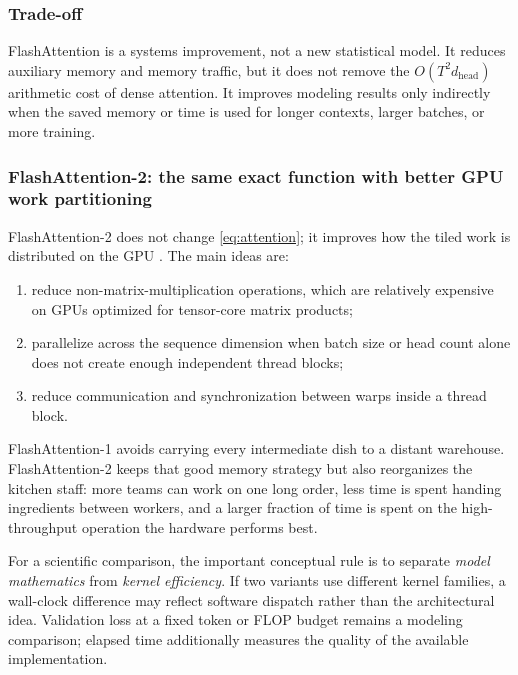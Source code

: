 \documentclass[11pt,a4paper]{article}
\theoremstyle{definition}
\theoremstyle{plain}
\newcommand{\dhead}{d_{\mathrm{head}}}
\begin{document}
\subsubsection{Trade-off}

FlashAttention is a systems improvement, not a new statistical model. It reduces auxiliary memory and memory traffic, but it does not remove the $O(T^2\dhead)$ arithmetic cost of dense attention. It improves modeling results only indirectly when the saved memory or time is used for longer contexts, larger batches, or more training.


\subsubsection{FlashAttention-2: the same exact function with better GPU work partitioning}

FlashAttention-2 does not change \cref{eq:attention}; it improves how the tiled work is distributed on the GPU \cite{dao2023flashattention2}. The main ideas are:
\begin{enumerate}[nosep]
    \item reduce non-matrix-multiplication operations, which are relatively expensive on GPUs optimized for tensor-core matrix products;
    \item parallelize across the sequence dimension when batch size or head count alone does not create enough independent thread blocks;
    \item reduce communication and synchronization between warps inside a thread block.
\end{enumerate}

\begin{intuitionbox}
FlashAttention-1 avoids carrying every intermediate dish to a distant warehouse. FlashAttention-2 keeps that good memory strategy but also reorganizes the kitchen staff: more teams can work on one long order, less time is spent handing ingredients between workers, and a larger fraction of time is spent on the high-throughput operation the hardware performs best.
\end{intuitionbox}

For a scientific comparison, the important conceptual rule is to separate \emph{model mathematics} from \emph{kernel efficiency}. If two variants use different kernel families, a wall-clock difference may reflect software dispatch rather than the architectural idea. Validation loss at a fixed token or FLOP budget remains a modeling comparison; elapsed time additionally measures the quality of the available implementation.
\end{document}
